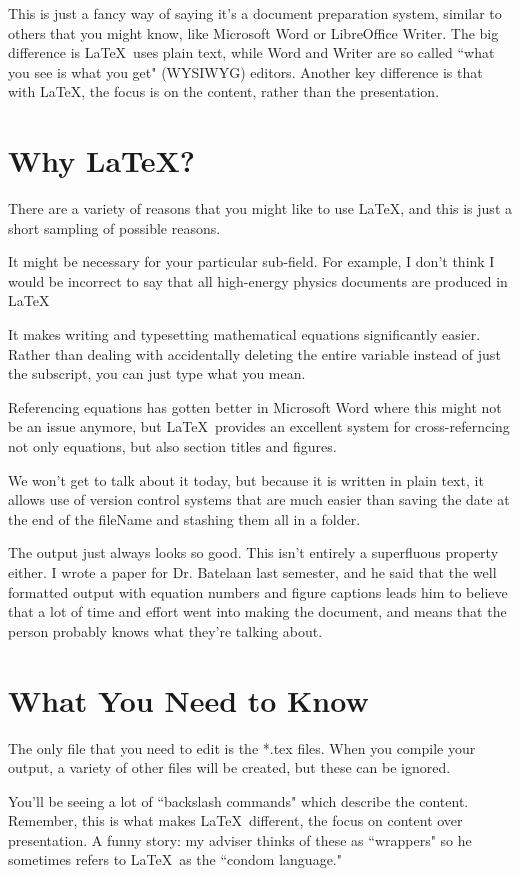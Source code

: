 \documentclass[12pt]{article}
\begin{document}
	This is just a fancy way of saying it's a document
	preparation system, similar to others that you might
	know, like Microsoft Word or LibreOffice Writer.
	The big difference is \LaTeX\ uses plain text, while
	Word and Writer are so called ``what you see is what you
	get" (WYSIWYG) editors. Another key difference is 
	that with \LaTeX, the focus is on the content, rather than
	the presentation. 
\section{Why \LaTeX?}
	There are a variety of reasons that you might like to 
	use \LaTeX, and this is just a short sampling of possible
	reasons. 

	It might be necessary for your particular sub-field. For 
	example, I don't think I would be incorrect to say that 
	all high-energy physics documents are produced in \LaTeX\

	It makes writing and typesetting mathematical equations
	significantly easier. Rather than dealing with accidentally
	deleting the entire variable instead of just the subscript, 
	you can just type what you mean. 

	Referencing equations has gotten better in Microsoft Word 
	where this might not be an issue anymore, but \LaTeX\ provides
	an excellent system for cross-referncing not only equations,
	but also section titles and figures.

	We won't get to talk about it today, but because it is 
	written in plain text, it allows use of version control
	systems that are much easier than saving the date at the end
	of the fileName and stashing them all in a folder. 

	The output just always looks so good. This isn't entirely a 
	superfluous property either. I wrote a paper for Dr. Batelaan
	last semester, and he said that the well formatted output
	with equation numbers and figure captions leads him to
	believe that a lot of time and effort went into making the 
	document, and means that the person probably knows what
	they're talking about. 

\section{What You Need to Know}
	The only file that you need to edit is the *.tex files. 
	When you compile your output, a variety of other files will
	be created, but these can be ignored.

	You'll be seeing a lot of ``backslash commands" which 
	describe the content. Remember, this is what makes \LaTeX\
	different, the focus on content over presentation. A funny 
	story: my adviser thinks of these as ``wrappers" so he 
	sometimes refers to \LaTeX\ as the ``condom language."
\end{document}
